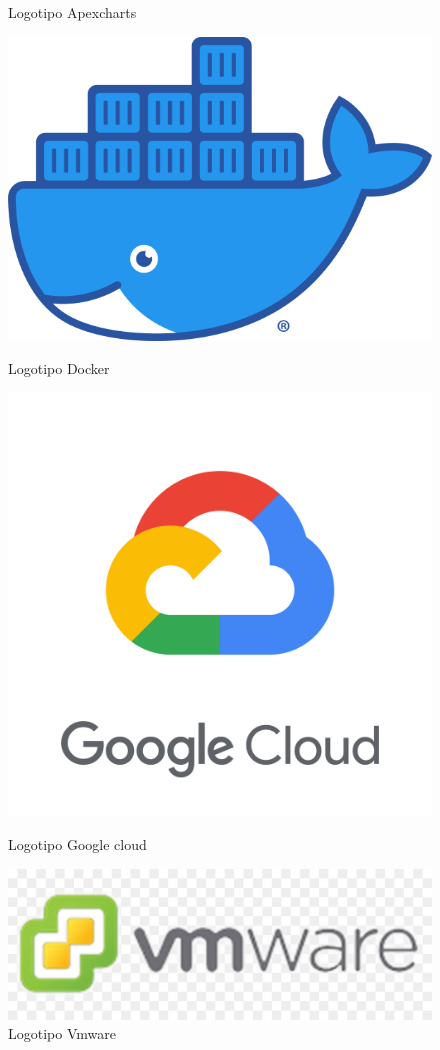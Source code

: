 \documentclass[11pt,spanish,listoffigures,listoftables]{tfgetsinf}
\begin{document}
\begin{figure}[!htb]
    \caption{Logotipo Apexcharts}\label{fig:LogoApexcharts}
  \endminipage\hfill
   \includegraphics[width=\linewidth]{img/Moby-logo.png}
   \caption{Logotipo Docker}\label{fig:LogoDocker}
  \endminipage\hfill
     \includegraphics[width=\linewidth]{img/google_cloud_main.png}
     \caption{Logotipo Google cloud}\label{fig:LogoGcloud}
  \endminipage\hfill
     \includegraphics[width=\linewidth]{img/logo-vmware.jpg}
     \caption{Logotipo Vmware}\label{fig:LogoVmware}
   \endminipage
\end{figure}
\end{document}
